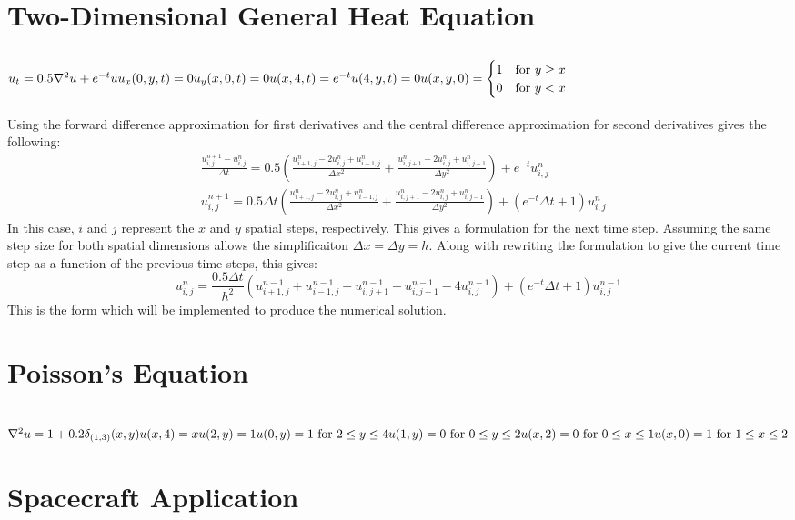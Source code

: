 \documentclass{article}
\begin{document}
\section{Two-Dimensional General Heat Equation}
\subsection*{$u_t = 0.5\nabla^2u + e^{-t}u\\u_x(0,y,t) = 0\\u_y(x,0,t) = 0\\u(x,4,t) = e^{-t}\\u(4,y,t) = 0\\u(x,y,0) = \begin{cases}
1 & \text{for } y \geq x\\
0 & \text{for } y < x
\end{cases}$}
Using the forward difference approximation for first derivatives and the central difference approximation for second derivatives gives the following:
\begin{equation}
    \begin{aligned}
        &\frac{u_{i,j}^{n+1} - u_{i,j}^n}{\Delta t} = 0.5\left(\frac{u_{i+1,j}^n - 2u_{i,j}^n + u_{i-1,j}^n}{\Delta x^2} + \frac{u_{i,j+1}^n - 2u_{i,j}^n + u_{i,j-1}^n}{\Delta y^2}\right) + e^{-t}u_{i,j}^n\\
        &u_{i,j}^{n+1} = 0.5\Delta t\left(\frac{u_{i+1,j}^n - 2u_{i,j}^n + u_{i-1,j}^n}{\Delta x^2} + \frac{u_{i,j+1}^n - 2u_{i,j}^n + u_{i,j-1}^n}{\Delta y^2}\right) + \left(e^{-t}\Delta t + 1\right)u_{i,j}^n
    \end{aligned}
\end{equation}
In this case, $i$ and $j$ represent the $x$ and $y$ spatial steps, respectively. This gives a formulation for the next time step. Assuming the same step size for both spatial dimensions allows the simplificaiton $\Delta x = \Delta y = h$. Along with rewriting the formulation to give the current time step as a function of the previous time steps, this gives:
\begin{equation}
    u_{i,j}^n = \frac{0.5\Delta t}{h^2}\left(u_{i+1,j}^{n-1} + u_{i-1,j}^{n-1} + u_{i,j+1}^{n-1} + u_{i,j-1}^{n-1} - 4u_{i,j}^{n-1}\right) + \left(e^{-t}\Delta t + 1\right)u_{i,j}^{n-1}
\end{equation}
This is the form which will be implemented to produce the numerical solution.

\section{Poisson's Equation}
\subsection*{$\nabla^2u = 1 + 0.2\delta_{(1,3)}(x,y)\\u(x,4) = x\\u(2,y) = 1\\u(0,y) = 1 \text{ for } 2 \leq y \leq 4\\u(1,y) = 0 \text{ for } 0 \leq y \leq 2\\u(x,2) = 0 \text{ for } 0 \leq x \leq 1\\u(x,0) = 1 \text{ for } 1 \leq x \leq 2$}

\section{Spacecraft Application}
\end{document}
